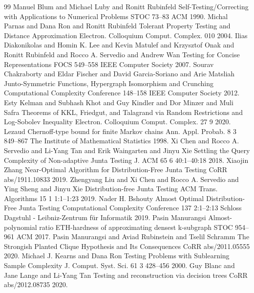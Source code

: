 \documentclass[10pt,a4paper]{article}
\theoremstyle{plain}
\theoremstyle{remark}
\theoremstyle{plain}
\begin{document}
\begin{thebibliography}{99}
 Manuel Blum and Michael Luby and Ronitt Rubinfeld Self-Testing/Correcting with Applications to Numerical Problems {STOC} 73--83 {ACM} 1990.
 Michal Parnas and Dana Ron and Ronitt Rubinfeld Tolerant Property Testing and Distance Approximation Electron. Colloquium Comput. Complex. 010 2004.
 Ilias Diakonikolas and Homin K. Lee and Kevin Matulef and Krzysztof Onak and Ronitt Rubinfeld and Rocco A. Servedio and Andrew Wan Testing for Concise Representations {FOCS} 549--558 {IEEE} Computer Society 2007.
 Sourav Chakraborty and Eldar Fischer and David Garcia{-}Soriano and Arie Matsliah Junto-Symmetric Functions, Hypergraph Isomorphism and Crunching Computational Complexity Conference 148--158 {IEEE} Computer Society 2012.
 Esty Kelman and Subhash Khot and Guy Kindler and Dor Minzer and Muli Safra Theorems of KKL, Friedgut, and Talagrand via Random Restrictions and Log-Sobolev Inequality Electron. Colloquium Comput. Complex. 27 9 2020.
 Lezaud Chernoff-type bound for finite Markov chains Ann. Appl. Probab. 8 3 849--867 The Institute of Mathematical Statistics 1998.
 Xi Chen and Rocco A. Servedio and Li{-}Yang Tan and Erik Waingarten and Jinyu Xie Settling the Query Complexity of Non-adaptive Junta Testing J. {ACM} 65 6 40:1--40:18 2018.
 Xiaojin Zhang Near-Optimal Algorithm for Distribution-Free Junta Testing CoRR abs/1911.10833 2019.
 Zhengyang Liu and Xi Chen and Rocco A. Servedio and Ying Sheng and Jinyu Xie Distribution-free Junta Testing {ACM} Trans. Algorithms 15 1 1:1--1:23 2019.
 Nader H. Bshouty Almost Optimal Distribution-Free Junta Testing Computational Complexity Conference 137 2:1--2:13 Schloss Dagstuhl - Leibniz-Zentrum f{\"{u}}r Informatik 2019.
 Pasin Manurangsi Almost-polynomial ratio ETH-hardness of approximating densest k-subgraph {STOC} 954--961 {ACM} 2017.
 Pasin Manurangsi and Aviad Rubinstein and Tselil Schramm The Strongish Planted Clique Hypothesis and Its Consequences CoRR abs/2011.05555 2020.
 Michael J. Kearns and Dana Ron Testing Problems with Sublearning Sample Complexity J. Comput. Syst. Sci. 61 3 428--456 2000.
 Guy Blanc and Jane Lange and Li{-}Yang Tan Testing and reconstruction via decision trees CoRR abs/2012.08735 2020.

\end{thebibliography}
\end{document}
